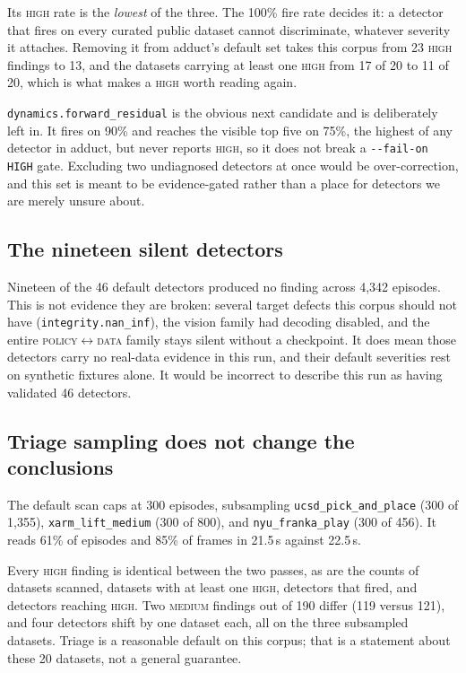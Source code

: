 \documentclass[10pt,a4paper]{article}
\newcommand{\dtr}[1]{\texttt{\small #1}}
\begin{document}
Its \textsc{high} rate is the \emph{lowest} of the three. The 100\% fire rate decides it: a
detector that fires on every curated public dataset cannot discriminate, whatever severity it
attaches. Removing it from adduct's default set takes this corpus from 23 \textsc{high}
findings to 13, and the datasets carrying at least one \textsc{high} from 17 of 20 to 11 of
20, which is what makes a \textsc{high} worth reading again.

\dtr{dynamics.forward\_residual} is the obvious next candidate and is deliberately left in.
It fires on 90\% and reaches the visible top five on 75\%, the highest of any detector in
adduct, but never reports \textsc{high}, so it does not break a \texttt{-{}-fail-on HIGH}
gate. Excluding two undiagnosed detectors at once would be over-correction, and this set is
meant to be evidence-gated rather than a place for detectors we are merely unsure about.

\subsection{The nineteen silent detectors}

Nineteen of the 46 default detectors produced no finding across 4{,}342 episodes. This is
not evidence they are broken: several target defects this corpus should not have
(\dtr{integrity.nan\_inf}), the vision family had decoding disabled, and the entire
\textsc{policy}$\leftrightarrow$\textsc{data} family stays silent without a checkpoint. It
does mean those detectors carry no real-data evidence in this run, and their default
severities rest on synthetic fixtures alone. It would be incorrect to describe this run as
having validated 46 detectors.

\subsection{Triage sampling does not change the conclusions}
\label{sec:triage}

The default scan caps at 300 episodes, subsampling \dtr{ucsd\_pick\_and\_place} (300 of
1{,}355), \dtr{xarm\_lift\_medium} (300 of 800), and \dtr{nyu\_franka\_play} (300 of 456).
It reads 61\% of episodes and 85\% of frames in 21.5\,s against 22.5\,s.

Every \textsc{high} finding is identical between the two passes, as are the counts of
datasets scanned, datasets with at least one \textsc{high}, detectors that fired, and
detectors reaching \textsc{high}. Two \textsc{medium} findings out of 190 differ
(119 versus 121), and four detectors shift by one dataset each, all on the three subsampled
datasets. Triage is a reasonable default on this corpus; that is a statement about these 20
datasets, not a general guarantee.
\end{document}
